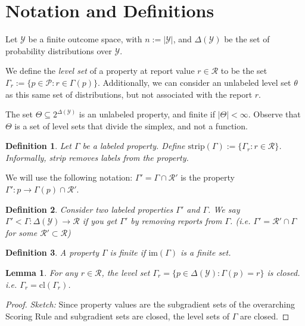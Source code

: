 \documentclass[12pt]{article}
\newcommand{\Comments}{1}
\newcommand{\mynote}[2]{\ifnum\Comments=1\textcolor{#1}{#2}\fi}
\newcommand{\jessie}[1]{\mynote{purple}{[JF: #1]}}
\renewcommand{\P}{\mathcal{P}}
\newcommand{\R}{\mathcal{R}}
\newcommand{\Y}{\mathcal{Y}}
\newcommand{\im}{\text{im}}
\newtheorem{lemma}{Lemma}
\newtheorem{definition}{Definition}
\begin{document}
\section{Notation and Definitions}

Let $\Y$ be a finite outcome space, with $n:=|\Y|$, and $\Delta(\Y)$ be the set of probability distributions over $\Y$.

We define the \emph{level set} of a property at report value $r\in\R$ to be the set $\Gamma_r := \{p\in\P : r \in \Gamma(p)\}$.
Additionally, we can consider an unlabeled level set $\theta$ as this same set of distributions, but not associated with the report $r$.

The set $\Theta \subseteq 2^{\Delta(\Y)}$ is an unlabeled property, and finite if $|\Theta| < \infty$.
Observe that $\Theta$ is a set of level sets that divide the simplex, and not a function.

\begin{definition}
Let $\Gamma$ be a labeled property.
Define $\text{strip}(\Gamma) := \{ \Gamma_r : r \in \R \}$.
Informally, strip removes labels from the property.
\end{definition}

We will use the following notation: $\Gamma' = \Gamma \cap \R'$ is the property $\Gamma' : p \to \Gamma(p) \cap \R'$.

\begin{definition}
  Consider two labeled properties $\Gamma'$ and $\Gamma$.
  We say $\Gamma' < \Gamma : \Delta(\Y) \to \R$ if you get $\Gamma'$ by removing reports from $\Gamma$.
  (i.e. $\Gamma' = \R' \cap \Gamma$ for some $\R' \subset \R$)
\end{definition}

\begin{definition}
A property $\Gamma$ is \emph{finite} if $\im(\Gamma)$ is a finite set.
\end{definition}

\begin{lemma}\label{conj:closed-level-sets}
  For any $r\in\R$, the level set $\Gamma_r = \{ p \in \Delta(\Y) : \Gamma(p) = r \}$ is closed.
  i.e. $\Gamma_r = \text{cl} (\Gamma_r)$.
\end{lemma}
\begin{proof}
  \emph{Sketch:  } Since property values are the subgradient sets of the overarching Scoring Rule and subgradient sets are closed, the level sets of $\Gamma$ are closed.
\end{proof}
\end{document}
